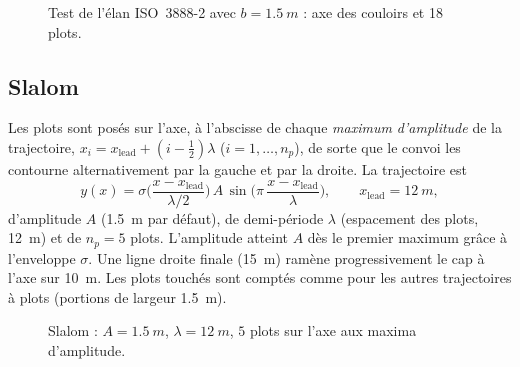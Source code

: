 \documentclass[11pt,a4paper]{article}
\begin{document}
\begin{figure}[H]\centering
{}
\caption{Test de l'élan ISO~3888-2 avec $b=\SI{1,5}{m}$ : axe des couloirs et 18 plots.}\label{fig:iso}
\end{figure}

\subsection{Slalom}
Les plots sont posés sur l'axe, à l'abscisse de chaque \emph{maximum d'amplitude} de la trajectoire, $x_i=x_{\text{lead}}+(i-\tfrac12)\lambda$ ($i=1,\dots,n_p$), de sorte que le convoi les contourne alternativement par la gauche et par la droite. La trajectoire est
\begin{equation}
 y(x)=\sigma\!\Big(\frac{x-x_{\text{lead}}}{\lambda/2}\Big)\,A\,\sin\!\Big(\pi\,\frac{x-x_{\text{lead}}}{\lambda}\Big),\qquad x_{\text{lead}}=\SI{12}{m},
\end{equation}
d'amplitude $A$ (\SI{1,5}{m} par défaut), de demi-période $\lambda$ (espacement des plots, \SI{12}{m}) et de $n_p=5$ plots. L'amplitude atteint $A$ dès le premier maximum grâce à l'enveloppe $\sigma$. Une ligne droite finale (\SI{15}{m}) ramène progressivement le cap à l'axe sur \SI{10}{m}. Les plots touchés sont comptés comme pour les autres trajectoires à plots (portions de largeur \SI{1,5}{m}).

\begin{figure}[H]\centering
{}
\caption{Slalom : $A=\SI{1,5}{m}$, $\lambda=\SI{12}{m}$, $5$ plots sur l'axe aux maxima d'amplitude.}\label{fig:slalom}
\end{figure}
\end{document}
